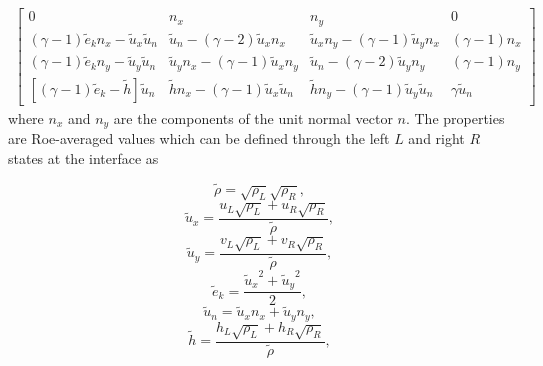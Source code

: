 \begin{align} \label{eq:eq_roe_matrix}
\begin{bmatrix}
    0 & n_x & n_y & 0\\
	(\gamma - 1)\tilde{e}_k n_x - \tilde{u}_x \tilde{u}_n & \tilde{u}_n - (\gamma-2)\tilde{u}_x n_x & \tilde{u}_x n_y - (\gamma-1)\tilde{u}_y n_x & (\gamma-1)n_x\\
	(\gamma - 1)\tilde{e}_k n_y - \tilde{u}_y \tilde{u}_n & \tilde{u}_y n_x - (\gamma-1)\tilde{u}_x n_y & \tilde{u}_n - (\gamma-2)\tilde{u}_y n_y & (\gamma-1)n_y\\
	[(\gamma - 1)\tilde{e}_k -\tilde{h}]\tilde{u}_n & \tilde{h}n_x - (\gamma-1)\tilde{u}_x \tilde{u}_n & \tilde{h}n_y - (\gamma-1)\tilde{u}_y \tilde{u}_n & \gamma\tilde{u}_n
\end{bmatrix}     
\end{align}
where $n_x$ and $n_y$ are the components of the unit normal vector $n$. The properties are Roe-averaged values which can be defined through the left $L$ and right $R$ states at the interface as

\begin{equation}
    \label{eq_roe_density}
    \tilde{\rho} = \sqrt{\rho_L}\sqrt{\rho_R},
\end{equation}
%
\begin{equation}
    \label{eq_roe_ux}
    \tilde{u}_x = \frac{u_L \sqrt{\rho_L} + u_R \sqrt{\rho_R}}{\tilde{\rho}},
\end{equation}
%
\begin{equation}
    \label{eq_roe_uy}
    \tilde{u}_y = \frac{v_L \sqrt{\rho_L} + v_R \sqrt{\rho_R}}{\tilde{\rho}},
\end{equation}
%
\begin{equation}
    \label{eq_roe_ek}
    \tilde{e}_k = \frac{{\tilde{u}_x}^2 + {\tilde{u}_y}^2}{2},
\end{equation}
%
\begin{equation}
    \label{eq_roe_un}
    \tilde{u}_n =\tilde{u}_x n_x + \tilde{u}_y n_y,
\end{equation}
%
\begin{equation}
    \label{eq_roe_h}
    \tilde{h} = \frac{h_L \sqrt{\rho_L} + h_R \sqrt{\rho_R}}{\tilde{\rho}},
\end{equation}

